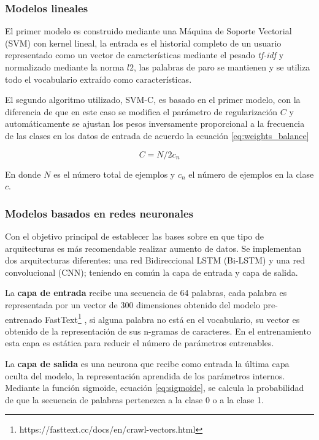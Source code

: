 \subsubsection{Modelos lineales}
 El primer modelo es construido mediante una Máquina de Soporte Vectorial (SVM) con kernel lineal, la entrada es el historial completo de un usuario representado como un vector de características mediante el pesado \textit{tf-idf} y normalizado mediante la norma $l2$, las palabras de paro se mantienen y se utiliza todo el vocabulario extraído como características. 
 
 El segundo algoritmo utilizado, SVM-C,  es basado en el primer modelo, con la diferencia de que en este caso se modifica el parámetro de regularización $C$ y automáticamente se ajustan los pesos inversamente proporcional a la frecuencia de las clases en los datos de entrada de acuerdo la ecuación \ref{eq:weights_balance}
 
 \begin{equation}
 \label{eq:weights_balance}
     C = N/2c_n
 \end{equation}
 
 En donde $N$ es el número total de ejemplos y $c_n$ el número de ejemplos en la clase $c$.  

\subsubsection{Modelos basados en redes neuronales}

Con el objetivo principal de establecer las bases sobre en que tipo de arquitecturas es más recomendable realizar aumento de datos. Se implementan dos arquitecturas diferentes: una red Bidireccional LSTM (Bi-LSTM) y una red convolucional (CNN); teniendo en común la capa de entrada y capa de salida.

La \textbf{capa de entrada} recibe una secuencia de 64 palabras, cada palabra es representada por un vector de 300 dimensiones obtenido del modelo pre-entrenado FastText\footnote{https://fasttext.cc/docs/en/crawl-vectors.html} , si alguna palabra no está en el vocabulario, su vector es obtenido de la representación de sus n-gramas de caracteres. En el entrenamiento esta capa es estática para reducir el número de parámetros entrenables.

La \textbf{capa de salida} es una neurona que recibe como entrada la última capa oculta del modelo, la representación aprendida de los parámetros internos. Mediante la función sigmoide, ecuación \ref{eq:sigmoide}, se calcula la probabilidad de que la secuencia de palabras pertenezca a la clase 0 o a la clase 1.

